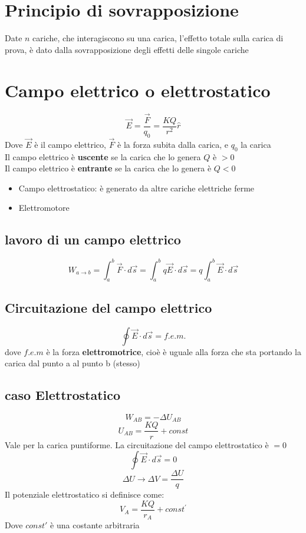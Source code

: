 \documentclass[a4paper]{report}
\begin{document}
  \section{Principio di sovrapposizione}
  Date $n$ cariche, che interagiscono su una carica, l'effetto totale sulla carica di prova, è dato dalla sovrapposizione degli effetti delle singole cariche

  \section{Campo elettrico o elettrostatico}
  \[\vec{E} = \frac{\vec{F}}{q_0} = \frac{K Q}{r^2} \hat{r}\]
  Dove $\vec{E}$ è il campo elettrico, $\vec{F}$ è la forza subita dalla carica, e $q_0$ la carica\\
  Il campo elettrico è \textbf{uscente} se la carica che lo genera $Q$ è $>0$\\
  Il campo elettrico è \textbf{entrante} se la carica che lo genera è $Q<0$

  \begin{itemize}
    \item Campo elettrostatico: è generato da altre cariche elettriche ferme
    \item Elettromotore
  \end{itemize}

  \subsection{lavoro di un campo elettrico}
  \[ W_{a \rightarrow b} = \int_a^b \vec{F}\cdot d\vec{s} = \int_a^b q \vec{E} \cdot d\vec{s} = q \int_a^b \vec{E}\cdot d\vec{s} \]

  \subsection{Circuitazione del campo elettrico}
  \[\oint \vec{E} \cdot d\vec{s} = f.e.m.\]
  dove $f.e.m$ è la forza \textbf{elettromotrice}, cioè è uguale alla forza che sta portando la carica dal punto a al punto b (stesso)

  \subsection{caso Elettrostatico}
  \[ W_{AB} = - \Delta U_{AB}\]
  \[ U_{AB} = \frac{KQ}{r} + const \]
  Vale per la carica puntiforme. La circuitazione del campo elettrostatico è $=0$
  \[ \oint \vec{E} \cdot d\vec{s} = 0 \]
  \[ \Delta U \longrightarrow \Delta V = \frac{\Delta U}{q} \]
  Il potenziale elettrostatico si definisce come:
  \[ V_A = \frac{KQ}{r_A} + const^{'}\]
  Dove $const'$ è una costante arbitraria
\end{document}
